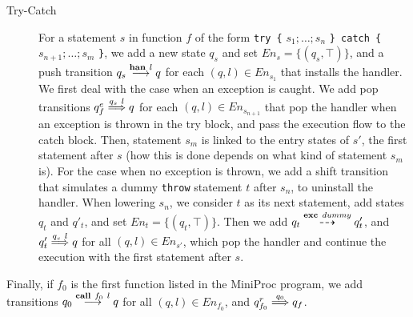 \documentclass[9pt,a4paper]{article}
\begin{document}
\begin{description}
\item[Try-Catch]
For a statement $s$ in function $f$ of the form \texttt{try \{} $s_1; \dots; s_n$ \texttt{\} catch \{} $s_{n+1}; \dots; s_m$ \texttt{\}},
we add a new state $q_s$ and set $\mathit{En}_s = \{(q_s, \top)\}$, and a push transition $q_s \stackrel{\mathbf{han} \ l}{\longrightarrow} q$ for each $(q, l) \in \mathit{En}_{s_1}$ that installs the handler.
We first deal with the case when an exception is caught.
We add pop transitions $q^e_f \stackrel{q_s \ l}{\Longrightarrow} q$ for each $(q, l) \in \mathit{En}_{s_{n+1}}$ that pop the handler when an exception is thrown in the try block, and pass the execution flow to the catch block.
Then, statement $s_m$ is linked to the entry states of $s'$, the first statement after $s$ (how this is done depends on what kind of statement $s_m$ is).
For the case when no exception is thrown, we add a shift transition that simulates a dummy \texttt{throw} statement $t$ after $s_n$, to uninstall the handler.
When lowering $s_n$, we consider $t$ as its next statement, add states $q_t$ and $q'_t$, and set $\mathit{En}_t = \{(q_t, \top)\}$.
Then we add $q_t \vshift{\lthrow \ \mathit{dummy}} q'_t$, and $q'_t \stackrel{q_s \ l}{\Longrightarrow} q$ for all $(q, l) \in \mathit{En}_{s'}$, which pop the handler and continue the execution with the first statement after $s$.
\end{description}

Finally, if $f_0$ is the first function listed in the MiniProc program, we add transitions $q_0 \stackrel{\mathbf{call} \ f_0 \ l}{\longrightarrow} q$ for all $(q, l) \in \mathit{En}_{f_0}$, and $q^r_{f_0} \stackrel{q_0}{\Longrightarrow} q_f$.
\end{document}
